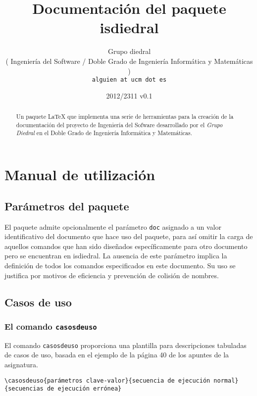 \documentclass[draft]{ltxdoc}
\begin{document}
\title{Documentación del paquete \textsf{isdiedral}}
\author{Grupo diedral\\(\small{ }Ingeniería del Software / Doble Grado de Ingeniería Informática y Matemáticas )\\
\texttt{\color{gray}alguien at ucm dot es}}
\date{2012/2311 \qquad v0.1}


\maketitle

\begin{abstract}
	Un paquete \LaTeX{} que implementa una serie de herramientas para la creación de la documentación del proyecto de Ingeniería del Sofware desarrollado por el \textit{Grupo Diedral} en el Doble Grado de Ingeniería Informática y Matemáticas.
\end{abstract}

\tableofcontents

\section{Manual de utilización}
\subsection{Parámetros del paquete}
	El paquete admite opcionalmente el parámetro \verb|doc| asignado a un valor identificativo del documento que hace uso del paquete, para así omitir la carga de aquellos comandos que han sido diseñados específicamente para otro documento pero se encuentran en \textsf{isdiedral}. La ausencia de este parámetro implica la definición de todos los comandos especificados en este documento. Su uso se justifica por motivos de eficiencia y prevención de colisión de nombres.
\subsection{Casos de uso}
\subsubsection{El comando \texttt{casosdeuso}} \label{comandocasos}
	El comando \verb|casosdeuso| proporciona una plantilla para descripciones tabuladas de casos de uso, basada en el ejemplo de la página 40 de los apuntes de la asignatura.

	\begin{Verbatim}[frame=single]
\casosdeuso{parámetros clave-valor}{secuencia de ejecución normal} 
{secuencias de ejecución errónea}
	\end{Verbatim}
\end{document}
